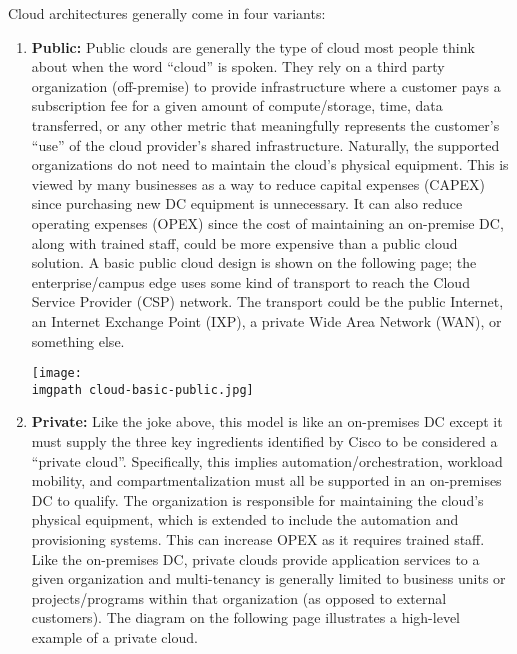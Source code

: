 Cloud architectures generally come in four variants:
\begin{enumerate}
  \item \textbf{Public:} Public clouds are generally the type of cloud most people think
  about when the word ``cloud'' is spoken. They rely on a third party organization
  (off-premise) to provide infrastructure where a customer pays a subscription
  fee for a given amount of compute/storage, time, data transferred, or any
  other metric that meaningfully represents the customer’s ``use'' of the cloud
  provider’s shared infrastructure. Naturally, the supported organizations do
  not need to maintain the cloud’s physical equipment. This is viewed by many
  businesses as a way to reduce capital expenses (CAPEX) since purchasing new
  DC equipment is unnecessary. It can also reduce operating expenses (OPEX)
  since the cost of maintaining an on-premise DC, along with trained staff,
  could be more expensive than a public cloud solution. A basic public cloud
  design is shown on the following page; the enterprise/campus edge uses some
  kind of transport to reach the Cloud Service Provider (CSP) network. The
  transport could be the public Internet, an Internet Exchange Point (IXP),
  a private Wide Area Network (WAN), or something else.

    \begin{minipage}[t]{\linewidth}
	  \centering
      \texttt{[image: \\imgpath cloud-basic-public.jpg]}
    \end{minipage}

% 
% 
  \item \textbf{Private:} Like the joke above, this model is like an on-premises
  DC except it must supply the three key ingredients identified by Cisco to be
  considered a ``private cloud''. Specifically, this implies
  automation/orchestration, workload mobility, and compartmentalization must
  all be supported in an on-premises DC to qualify. The organization is
  responsible for maintaining the cloud’s physical equipment, which is
  extended to include the automation and provisioning systems. This can
  increase OPEX as it requires trained staff. Like the on-premises DC, private
  clouds provide application services to a given organization and
  multi-tenancy is generally limited to business units or projects/programs
  within that organization (as opposed to external customers). The diagram on
  the following page illustrates a high-level example of a private cloud.


\end{enumerate}
